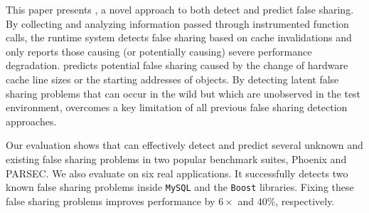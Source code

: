 \label{sec:conclusion}
This paper presents \Predator{}, a novel approach to both detect and predict false sharing. By collecting and analyzing information passed through instrumented function calls, the runtime system detects false sharing based on cache invalidations and only reports those  causing (or potentially causing) severe performance degradation.
\Predator{} predicts potential false sharing caused by the change of hardware cache line sizes or the starting addresses of objects. By detecting latent false sharing problems that can occur in the wild but which are unobserved in the test environment, \Predator{} overcomes a key limitation of
all previous false sharing detection approaches.

Our evaluation shows that \Predator{} can effectively detect and predict several unknown and existing false sharing problems 
in two popular benchmark suites, Phoenix and PARSEC. 
We also evaluate \Predator{} on six real applications. 
It successfully detects two known false sharing problems inside \texttt{MySQL} and the \texttt{Boost} libraries.
Fixing these false sharing problems improves performance by $6\times$ and $40\%$, respectively.
